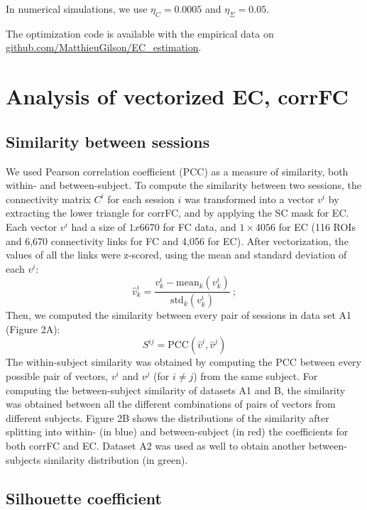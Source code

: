 \documentclass{article}
\begin{document}
In numerical simulations, we use $\eta_C = 0.0005$ and $\eta_\Sigma = 0.05$.

The optimization code is available with the empirical data on \url{github.com/MatthieuGilson/EC_estimation}. 


\section{Analysis of vectorized EC, corrFC}

\subsection{Similarity between sessions}

We used Pearson correlation coefficient (PCC) as a measure of similarity, both within- and between-subject. To compute the similarity between two sessions, the connectivity matrix $C^i$ for each session $i$ was transformed into a vector $v^i$ by extracting the lower triangle for corrFC, and by applying the SC mask for EC. Each vector $v^i$ had a size of $1x6670$ for FC data, and $1\times4056$ for EC (116 ROIs and 6,670 connectivity links for FC and 4,056 for EC). After vectorization, the values of all the links were z-scored, using the mean and standard deviation of each $v^i$:
\begin{equation}
\hat{v}^i_k = \frac{v^i_k - \mathrm{mean}_k(v^i_k)}{\mathrm{std}_k(v^i_k)}
\ ;
\end{equation}
Then, we computed the similarity between every pair of sessions in data set A1 (Figure 2A):
\begin{equation} \label{eq_simil}
S^{ij} = \mathrm{PCC}(\hat{v}^i,\hat{v}^j)
\end{equation}
The within-subject similarity was obtained by computing the PCC between every possible pair of vectors, $v^i$ and $v^j$ (for $i \neq j$) from the same subject. For computing the between-subject similarity of datasets A1 and B, the similarity was obtained between all the different combinations of pairs of vectors from different subjects. Figure 2B shows the distributions of the similarity after splitting into within- (in blue) and between-subject (in red) the coefficients for both corrFC and EC. Dataset A2 was used as well to obtain another between-subjects similarity distribution (in green).

\subsection{Silhouette coefficient}
\end{document}
